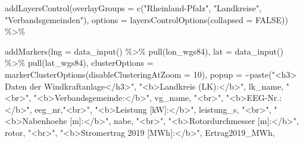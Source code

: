 \documentclass[
]{article}
\newenvironment{Shaded}{\begin{snugshade}}{\end{snugshade}}
\newcommand{\AttributeTok}[1]{\textcolor[rgb]{0.77,0.63,0.00}{#1}}
\newcommand{\ConstantTok}[1]{\textcolor[rgb]{0.00,0.00,0.00}{#1}}
\newcommand{\DecValTok}[1]{\textcolor[rgb]{0.00,0.00,0.81}{#1}}
\newcommand{\FunctionTok}[1]{\textcolor[rgb]{0.00,0.00,0.00}{#1}}
\newcommand{\NormalTok}[1]{#1}
\newcommand{\SpecialCharTok}[1]{\textcolor[rgb]{0.00,0.00,0.00}{#1}}
\newcommand{\StringTok}[1]{\textcolor[rgb]{0.31,0.60,0.02}{#1}}
\begin{document}
\begin{Shaded}
\begin{Highlighting}[]
            \FunctionTok{addLayersControl}\NormalTok{(}\AttributeTok{overlayGroups =} \FunctionTok{c}\NormalTok{(}\StringTok{"Rheinland{-}Pfalz"}\NormalTok{, }\StringTok{"Landkreise"}\NormalTok{, }\StringTok{"Verbandsgemeinden"}\NormalTok{),}
                             \AttributeTok{options =} \FunctionTok{layersControlOptions}\NormalTok{(}\AttributeTok{collapsed =} \ConstantTok{FALSE}\NormalTok{)) }\SpecialCharTok{\%\textgreater{}\%}
            
            \FunctionTok{addMarkers}\NormalTok{(}\AttributeTok{lng =} \FunctionTok{data\_input}\NormalTok{() }\SpecialCharTok{\%\textgreater{}\%} \FunctionTok{pull}\NormalTok{(lon\_wgs84),}
                       \AttributeTok{lat =} \FunctionTok{data\_input}\NormalTok{() }\SpecialCharTok{\%\textgreater{}\%} \FunctionTok{pull}\NormalTok{(lat\_wgs84),}
                       \AttributeTok{clusterOptions =} \FunctionTok{markerClusterOptions}\NormalTok{(}\AttributeTok{disableClusteringAtZoom =}
                                                               \DecValTok{10}\NormalTok{),}
                       \AttributeTok{popup =} \SpecialCharTok{\textasciitilde{}}\FunctionTok{paste}\NormalTok{(}\StringTok{"\textless{}h3\textgreater{} Daten der Windkraftanlage\textless{}/h3\textgreater{}"}\NormalTok{,}
                                      \StringTok{"\textless{}b\textgreater{}Landkreis (LK):\textless{}/b\textgreater{}"}\NormalTok{, lk\_name, }\StringTok{"\textless{}br\textgreater{}"}\NormalTok{,}
                                      \StringTok{"\textless{}b\textgreater{}Verbandsgemeinde:\textless{}/b\textgreater{}"}\NormalTok{, vg\_name, }\StringTok{"\textless{}br\textgreater{}"}\NormalTok{,}
                                      \StringTok{"\textless{}b\textgreater{}EEG{-}Nr.:\textless{}/b\textgreater{}"}\NormalTok{, eeg\_nr,}\StringTok{"\textless{}br\textgreater{}"}\NormalTok{,}
                                      \StringTok{"\textless{}b\textgreater{}Leistung [kW]:\textless{}/b\textgreater{}"}\NormalTok{, leistung\_s, }\StringTok{"\textless{}br\textgreater{}"}\NormalTok{,}
                                      \StringTok{"\textless{}b\textgreater{}Nabenhoehe [m]:\textless{}/b\textgreater{}"}\NormalTok{, nabe, }\StringTok{"\textless{}br\textgreater{}"}\NormalTok{,}
                                      \StringTok{"\textless{}b\textgreater{}Rotordurchmesser [m]:\textless{}/b\textgreater{}"}\NormalTok{, rotor, }\StringTok{"\textless{}br\textgreater{}"}\NormalTok{,}
                                      \StringTok{"\textless{}b\textgreater{}Stromertrag 2019 [MWh]:\textless{}/b\textgreater{}"}\NormalTok{, Ertrag2019\_MWh,}

\end{Highlighting}
\end{Shaded}
\end{document}
